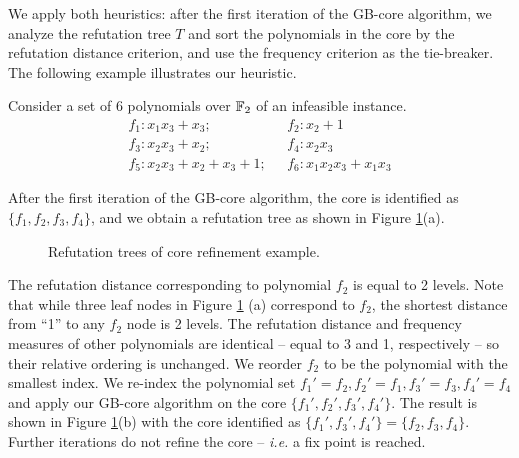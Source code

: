 
We apply both heuristics: after the first iteration of the GB-core
algorithm, we analyze the refutation tree $T$ and sort the polynomials
in the core by the refutation distance criterion, and use the
frequency criterion as the tie-breaker. The following example
illustrates our heuristic.  


\begin{Example} 
Consider a set of 6 polynomials over ${\mathbb{F}}_2$ of an
infeasible instance.
\begin{align*}
f_1: x_1x_3+x_3; & ~~~f_2: x_2 + 1\\
f_3: x_2x_3+x_2; & ~~~f_4: x_2x_3\\
f_5: x_2x_3 + x_2 + x_3 + 1; & ~~~f_6 : x_1x_2x_3 +x_1x_3
\end{align*}

After the first iteration of the GB-core algorithm, the core is
identified as $\{f_1, f_2,f_3,f_4\}$, and we obtain a
refutation tree as shown in Figure \ref{fig:refine}(a).  
\begin{figure}[h]
\caption{Refutation trees of core refinement example.}
\label{fig:refine}
\end{figure}

The refutation distance corresponding to polynomial $f_2$ is equal to
2 levels. Note that while three leaf nodes in Figure \ref{fig:refine} (a)
correspond to $f_2$, the shortest distance from ``1'' to any $f_2$
node is 2 levels. The refutation distance and frequency measures of
other polynomials are identical -- equal to 3 and 1, respectively --
so their relative ordering is unchanged. We reorder $f_2$ to be the
polynomial with the  smallest index. We re-index the polynomial set 
$f_1'=f_2, f_2' = f_1, f_3' = f_3, f_4' = f_4$
and apply our GB-core algorithm on the core
$\{f_1',f_2',f_3',f_4'\}$. The result is shown in
Figure \ref{fig:refine}(b) with the core identified as $\{f_1', f_3',
f_4'\} = \{f_2,f_3,f_4\}$. Further iterations do not refine the core
-- {\it i.e.} a fix point is reached. 
\end{Example}

